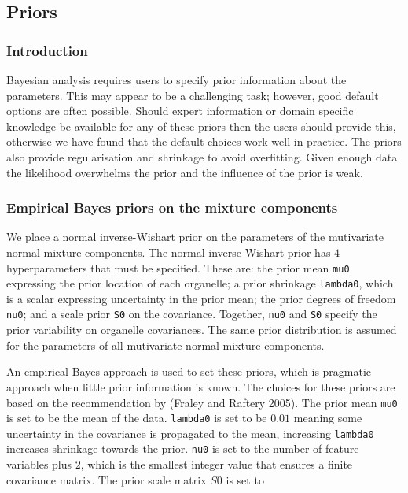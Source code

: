 \documentclass[
]{article}
\begin{document}
\hypertarget{priors}{%
\subsection{Priors}\label{priors}}

\hypertarget{introduction-1}{%
\subsubsection{Introduction}\label{introduction-1}}

Bayesian analysis requires users to specify prior information about the
parameters. This may appear to be a challenging task; however, good
default options are often possible. Should expert information or domain
specific knowledge be available for any of these priors then the users
should provide this, otherwise we have found that the default choices
work well in practice. The priors also provide regularisation and
shrinkage to avoid overfitting. Given enough data the likelihood
overwhelms the prior and the influence of the prior is weak.

\hypertarget{empirical-bayes-priors-on-the-mixture-components}{%
\subsubsection{Empirical Bayes priors on the mixture
components}\label{empirical-bayes-priors-on-the-mixture-components}}

We place a normal inverse-Wishart prior on the parameters of the
mutivariate normal mixture components. The normal inverse-Wishart prior
has \(4\) hyperparameters that must be specified. These are: the prior
mean \texttt{mu0} expressing the prior location of each organelle; a
prior shrinkage \texttt{lambda0}, which is a scalar expressing
uncertainty in the prior mean; the prior degrees of freedom
\texttt{nu0}; and a scale prior \texttt{S0} on the covariance. Together,
\texttt{nu0} and \texttt{S0} specify the prior variability on organelle
covariances. The same prior distribution is assumed for the parameters
of all mutivariate normal mixture components.

An empirical Bayes approach is used to set these priors, which is
pragmatic approach when little prior information is known. The choices
for these priors are based on the recommendation by (Fraley and Raftery
2005). The prior mean \texttt{mu0} is set to be the mean of the data.
\texttt{lambda0} is set to be \(0.01\) meaning some uncertainty in the
covariance is propagated to the mean, increasing \texttt{lambda0}
increases shrinkage towards the prior. \texttt{nu0} is set to the number
of feature variables plus \(2\), which is the smallest integer value
that ensures a finite covariance matrix. The prior scale matrix \(S0\)
is set to
\end{document}
